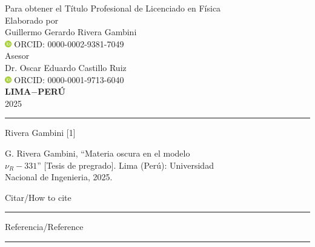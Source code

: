 \documentclass[11pt,spanish]{report}
\newcommand{\orcid}[1]{\href{https://orcid.org/#1}{\includegraphics[width=8pt]{orcid.pdf}}}
\begin{document}
\begin{titlepage}
	Para obtener el Título Profesional de Licenciado en Física	\\

	Elaborado por \\

    Guillermo Gerardo Rivera Gambini \\ \orcid{0000-0002-9381-7049} ORCID: 0000-0002-9381-7049  \\
    
	Asesor  \\
    
    Dr. Oscar Eduardo Castillo Ruiz \\ \orcid{0000-0001-9713-6040} ORCID: 0000-0001-9713-6040  \\[1.0cm]


    \vfill
    \textbf{LIMA$-$PERÚ}\\
    2025

\end{titlepage}
\setcounter{page}{2} %



\noindent\rule{16cm}{0.6pt}
\vspace{-0.4in}
\begin{paracol}{2}

\switchcolumn* 
\noindent Rivera Gambini [1]

\noindent [1] \hspace{0.2in} G. Rivera Gambini, ``Materia oscura en el modelo \\ \indent $\nu_R-331$'' [Tesis de pregrado]. Lima (Perú): Universidad \\ \indent Nacional de Ingenieria, 2025.

\switchcolumn

\centering

Citar/How to cite \\

\vspace{-0.2in}
\noindent\rule{4.5cm}{0.6pt}
\vspace{-0.6in}
\noindent Referencia/Reference


\end{paracol}
\vspace{-0.2in}
\noindent\rule{16cm}{0.6pt}



\vspace{1in}
\end{document}
